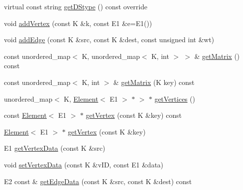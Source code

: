 \begin{DoxyCompactItemize}
\item 
virtual const string \mbox{\hyperlink{classbridges_1_1datastructure_1_1_graph_adj_matrix_a2f8c67da1078354156fc646097152c6d}{get\+D\+Stype}} () const override
\item 
void \mbox{\hyperlink{classbridges_1_1datastructure_1_1_graph_adj_matrix_aaebb2607d06b1c36548652dba0211744}{add\+Vertex}} (const K \&k, const E1 \&e=E1())
\item 
void \mbox{\hyperlink{classbridges_1_1datastructure_1_1_graph_adj_matrix_ab23870ac203b3784157ecb05443494a4}{add\+Edge}} (const K \&src, const K \&dest, const unsigned int \&wt)
\item 
const unordered\+\_\+map$<$ K, unordered\+\_\+map$<$ K, int $>$ $>$ \& \mbox{\hyperlink{classbridges_1_1datastructure_1_1_graph_adj_matrix_aaf5c1ae5267b7ff4c8fcc861221ff2e8}{get\+Matrix}} () const
\item 
const unordered\+\_\+map$<$ K, int $>$ \& \mbox{\hyperlink{classbridges_1_1datastructure_1_1_graph_adj_matrix_a0b49749793278a1910dd5ea67dbaeacf}{get\+Matrix}} (K key) const
\item 
unordered\+\_\+map$<$ K, \mbox{\hyperlink{classbridges_1_1datastructure_1_1_element}{Element}}$<$ E1 $>$ $\ast$ $>$ $\ast$ \mbox{\hyperlink{classbridges_1_1datastructure_1_1_graph_adj_matrix_a4bcf803c43af2f14224a0891b9260fbf}{get\+Vertices}} ()
\item 
const \mbox{\hyperlink{classbridges_1_1datastructure_1_1_element}{Element}}$<$ E1 $>$ $\ast$ \mbox{\hyperlink{classbridges_1_1datastructure_1_1_graph_adj_matrix_a3de2ef8ce16e0c0d2240a92838ffd8aa}{get\+Vertex}} (const K \&key) const
\item 
\mbox{\hyperlink{classbridges_1_1datastructure_1_1_element}{Element}}$<$ E1 $>$ $\ast$ \mbox{\hyperlink{classbridges_1_1datastructure_1_1_graph_adj_matrix_a4100f224c05a77dd2c362c05fa15e6a2}{get\+Vertex}} (const K \&key)
\item 
E1 \mbox{\hyperlink{classbridges_1_1datastructure_1_1_graph_adj_matrix_a0be12527de2ab43b9de9b7ccd6e94d94}{get\+Vertex\+Data}} (const K \&src)
\item 
void \mbox{\hyperlink{classbridges_1_1datastructure_1_1_graph_adj_matrix_a8fb501cd1b1953c85e2aa3963f8ecd1f}{set\+Vertex\+Data}} (const K \&v\+ID, const E1 \&data)
\item 
E2 const  \& \mbox{\hyperlink{classbridges_1_1datastructure_1_1_graph_adj_matrix_ab6cd22b1a8f1e9f1c0865ba7aec6c6ca}{get\+Edge\+Data}} (const K \&src, const K \&dest) const

\end{DoxyCompactItemize}
